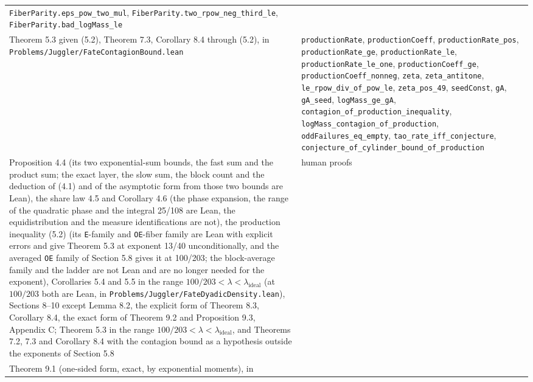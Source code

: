 \documentclass[11pt,a4paper]{article}
\begin{document}
\begin{longtable}[]{@{}
  >{\raggedright\arraybackslash}p{}
  >{\raggedright\arraybackslash}p{}@{}}
\texttt{\nolinkurl{FiberParity.eps_pow_two_mul}},
\texttt{\nolinkurl{FiberParity.two_rpow_neg_third_le}},
\texttt{\nolinkurl{FiberParity.bad_logMass_le}} \\
Theorem 5.3 given (5.2), Theorem 7.3, Corollary 8.4 through (5.2), in
\texttt{\nolinkurl{Problems/Juggler/FateContagionBound.lean}} &
\texttt{\nolinkurl{productionRate}},
\texttt{\nolinkurl{productionCoeff}},
\texttt{\nolinkurl{productionRate_pos}},
\texttt{\nolinkurl{productionRate_ge}},
\texttt{\nolinkurl{productionRate_le}},
\texttt{\nolinkurl{productionRate_le_one}},
\texttt{\nolinkurl{productionCoeff_ge}},
\texttt{\nolinkurl{productionCoeff_nonneg}}, \texttt{\nolinkurl{zeta}},
\texttt{\nolinkurl{zeta_antitone}},
\texttt{\nolinkurl{le_rpow_div_of_pow_le}},
\texttt{\nolinkurl{zeta_pos_49}}, \texttt{\nolinkurl{seedConst}},
\texttt{\nolinkurl{gA}}, \texttt{\nolinkurl{gA_seed}},
\texttt{\nolinkurl{logMass_ge_gA}},
\texttt{\nolinkurl{contagion_of_production_inequality}},
\texttt{\nolinkurl{logMass_contagion_of_production}},
\texttt{\nolinkurl{oddFailures_eq_empty}},
\texttt{\nolinkurl{tao_rate_iff_conjecture}},
\texttt{\nolinkurl{conjecture_of_cylinder_bound_of_production}} \\
Proposition 4.4 (its two exponential-sum bounds, the fast sum and the
product sum; the exact layer, the slow sum, the block count and the
deduction of (4.1) and of the asymptotic form from those two bounds are
Lean), the share law 4.5 and Corollary 4.6 (the phase expansion, the
range of the quadratic phase and the integral 25/108 are Lean, the
equidistribution and the measure identifications are not), the
production inequality (5.2) (its \texttt{\nolinkurl{E}}-family and
\texttt{\nolinkurl{OE}}-fiber family are Lean with explicit errors and
give Theorem 5.3 at exponent 13/40 unconditionally, and the averaged
\texttt{\nolinkurl{OE}} family of Section 5.8 gives it at 100/203; the
block-average family and the ladder are not Lean and are no longer
needed for the exponent), Corollaries 5.4 and 5.5 in the range
\(100/203<\lambda<\lambda_{\mathrm{ideal}}\) (at \(100/203\) both are
Lean, in \texttt{\nolinkurl{Problems/Juggler/FateDyadicDensity.lean}}),
Sections 8--10 except Lemma 8.2, the explicit form of Theorem 8.3,
Corollary 8.4, the exact form of Theorem 9.2 and Proposition 9.3,
Appendix C; Theorem 5.3 in the range
\(100/203<\lambda<\lambda_{\mathrm{ideal}}\), and Theorems 7.2, 7.3 and
Corollary 8.4 with the contagion bound as a hypothesis outside the
exponents of Section 5.8 & human proofs \\
Theorem 9.1 (one-sided form, exact, by exponential moments), in

\end{longtable}
\end{document}
